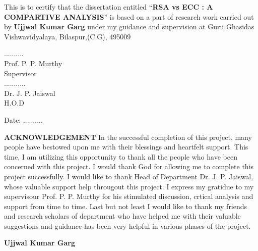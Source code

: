 \documentclass[12pt,a4paper]{article}
\begin{document}
	\author{\textbf{\centering Department of Mathematics\\ \hskip 4cm Guru Ghasidas Vishwavidyalaya}}
	\newline \vskip 1.5cm This is to certify that the dissertation entitled “\textbf{\small RSA vs ECC : A COMPARTIVE ANALYSIS}” is based on a part of research work carried out by \textbf{Ujjwal Kumar Garg} under my guidance and supervision at Guru Ghasidas Vishwavidyalaya, Bilaspur,(C.G), 495009
	\begin{flushright}
		..........\\Prof. P. P. Murthy\\Supervisor\\
		\vskip 2.25cm
		...........\\Dr. J. P. Jaiswal\\H.O.D
	\end{flushright}
	\begin{flushleft}
		Date: ..........
	\end{flushleft}
		\newpage
		\hskip 3.1cm \textbf{{\Large ACKNOWLEDGEMENT}}
		\vskip 1.1cm
			In the successful completion of this project, many people have bestowed upon me with their blessings and heartfelt support.
		 This time, I am utilizing this opportunity  to thank all the people who have been concerned with this project.
		I would thank God for allowing me to complete this project successfully.
		 I would like to thank Head of Department Dr. J. P. Jaiswal, whose valuable support help througout this project. I express my gratidue to my supervisour Prof. P. P. Murthy  for his stimulated discussion, crtical analysis and support from time to time. Last but not least I would like to thank my friends and research scholars of department who have helped me with their valuable suggestions and guidance has been very helpful in various phases of the project.
		\begin{flushleft}
			\vskip 2.5cm
			\textbf{{\Large 	Ujjwal Kumar Garg}}
		\end{flushleft}
		\newpage
	
		\tableofcontents
		\newpage
		
		
		
		\newpage
\end{document}
